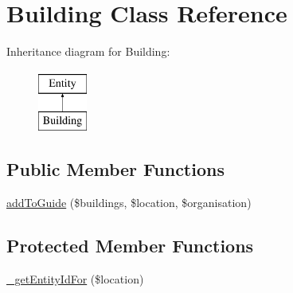 \hypertarget{classBuilding}{
\section{Building Class Reference}
\label{classBuilding}
}
Inheritance diagram for Building:\begin{figure}[H]
\begin{center}
\leavevmode
\includegraphics[height=2.000000cm]{classBuilding}
\end{center}
\end{figure}
\subsection*{Public Member Functions}
\begin{DoxyCompactItemize}
\item 
\hyperlink{classBuilding_ae389eaa4335d265b03d1b28e5be942b9}{addToGuide} (\$buildings, \$location, \$organisation)
\end{DoxyCompactItemize}
\subsection*{Protected Member Functions}
\begin{DoxyCompactItemize}
\item 
\hyperlink{classBuilding_a2b60e97b94a451b29658e42abf6883c9}{\_\-getEntityIdFor} (\$location)
\end{DoxyCompactItemize}


